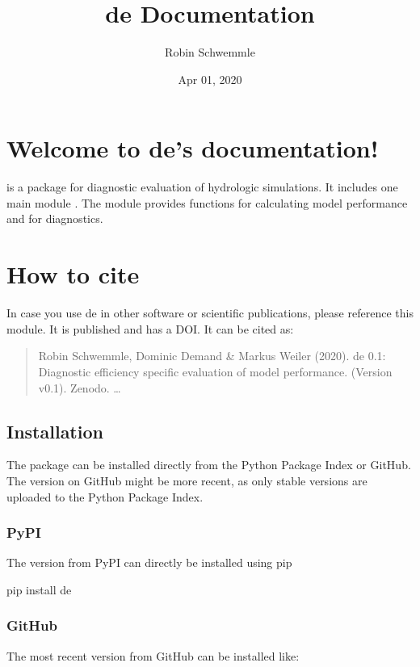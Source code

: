 \documentclass[letterpaper,10pt,english]{sphinxmanual}
\title{de Documentation}
\date{Apr 01, 2020}
\author{Robin Schwemmle}
\begin{document}
\pagestyle{empty}
\sphinxmaketitle
\pagestyle{plain}
\sphinxtableofcontents
\pagestyle{normal}
\label{\detokenize{index::doc}}



\chapter{Welcome to de’s documentation!}
\label{\detokenize{index:welcome-to-de-s-documentation}}
 is a package for diagnostic evaluation of hydrologic simulations. It
includes one main module . The module provides functions for calculating
model performance and for diagnostics.


\chapter{How to cite}
\label{\detokenize{index:how-to-cite}}
In case you use de in other software or scientific publications,
please reference this module. It is published and has a DOI. It can be cited
as:
\begin{quote}

Robin Schwemmle, Dominic Demand \& Markus Weiler (2020). de 0.1:
Diagnostic efficiency \textendash{} specific evaluation of model performance.
(Version v0.1). Zenodo. …
\end{quote}


\section{Installation}
\label{\detokenize{install:installation}}\label{\detokenize{install::doc}}
The package can be installed directly from the Python Package Index or GitHub.
The version on GitHub might be more recent, as only stable versions are
uploaded to the Python Package Index.


\subsection{PyPI}
\label{\detokenize{install:pypi}}
The version from PyPI can directly be installed using pip

\begin{sphinxVerbatim}[commandchars=\\\{\}]
pip install de
\end{sphinxVerbatim}


\subsection{GitHub}
\label{\detokenize{install:github}}
The most recent version from GitHub can be installed like:
\end{document}
